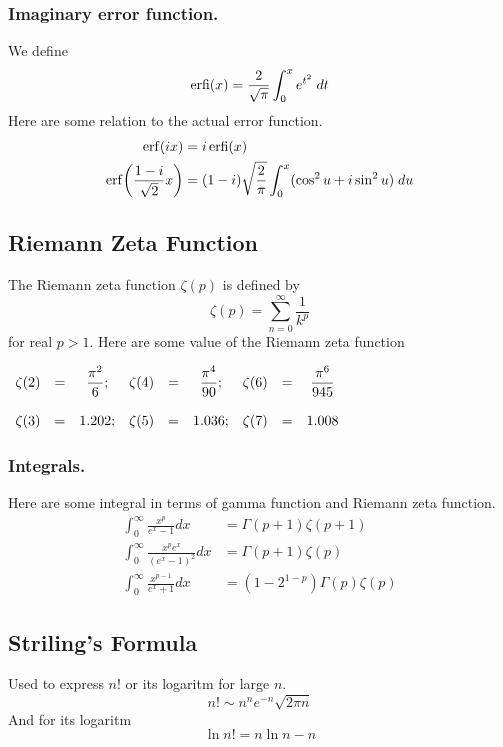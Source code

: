 \documentclass[../../main.tex]{subfiles}
\begin{document}
\subsubsection{Imaginary error function.} We deﬁne
\begin{equation*}
    \operatorname{erfi}(x)=\frac{2}{\sqrt{\pi}}\int_{0}^{x}e^{t^2}\;dt
\end{equation*}
Here are some relation to the actual error function.
\begin{align*}
    \operatorname{erf}(ix)&=i\operatorname{erfi}(x)\\
    \operatorname{erf}\biggl(\frac{1-i }{\sqrt{2}}x\biggr)&=(1-i   )\sqrt{\frac{2}{\pi}}\int_{0}^{x}(\cos^2u+i\sin^2u)\;du
\end{align*}

\subsection{Riemann Zeta Function}
The Riemann zeta function \(\zeta(p)\) is defined by
\begin{equation*}
    \zeta(p)=\sum_{n=0}^{\infty}\frac{1}{k^p}
\end{equation*}
for real $p>1$. Here are some value of the Riemann zeta function
\begin{center}
    $\begin{array}{c c c c c c c c c}
        \zeta(2)&=&\dfrac{\pi^2}{6};& \zeta(4)&=&\dfrac{\pi^4}{90}; & \zeta(6)&= &\dfrac{\pi^6}{945}\\\\
        \zeta(3)&=&1.202;&  \zeta(5)&=&1.036;& \zeta(7)&=&1.008 \\
    \end{array}$
\end{center}

\subsubsection{Integrals.} Here are some integral in terms of gamma function and Riemann zeta function.
\begin{align*}
    \int_{0}^{\infty}\frac{x^p}{e^x-1}dx&=\Gamma(p+1)\zeta(p+1)\\
    \int_{0}^{\infty}\frac{x^pe^x}{\left(e^x-1\right)^2}dx&= \Gamma(p+1)\zeta(p)\\
    \int_{0}^{\infty}\frac{x^{p-1}}{e^x+1}dx& = \left(1-2^{1-p}\right)\Gamma(p) \zeta(p)
\end{align*}

\subsection{Striling's Formula}
Used to express $n!$ or its logaritm for large $n$.
\begin{equation*}
    n!\sim n^ne^{-n}\sqrt{2\pi n}
\end{equation*}
And for its logaritm
\begin{equation*}
    \ln n!=n\ln n- n
\end{equation*}
\end{document}
